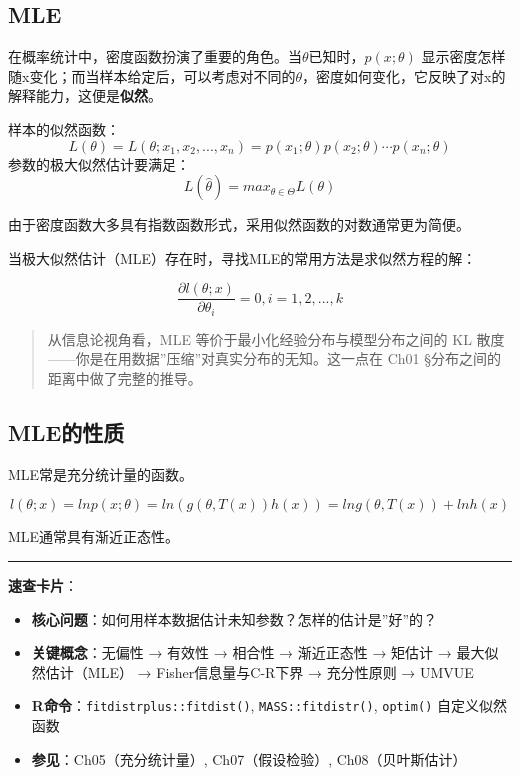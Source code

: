 \documentclass[
]{book}
\providecommand{\tightlist}{%
  \setlength{\itemsep}{0pt}\setlength{\parskip}{0pt}}
\begin{document}
\subsection{MLE}\label{mle}

在概率统计中，密度函数扮演了重要的角色。当\(\theta\)已知时，\(p(x;\theta)\) 显示密度怎样随x变化；而当样本给定后，可以考虑对不同的\(\theta\)，密度如何变化，它反映了对x的解释能力，这便是\textbf{似然}。

样本的似然函数：
\[
L(\theta)=L(\theta;x_1,x_2,...,x_n)=p(x_1;\theta)p(x_2;\theta)\cdots p(x_n;\theta)
\]
参数的极大似然估计要满足：
\[
L(\hat{\theta})=max_{\theta\in\Theta}L(\theta)
\]

由于密度函数大多具有指数函数形式，采用似然函数的对数通常更为简便。

当极大似然估计（MLE）存在时，寻找MLE的常用方法是求似然方程的解：

\[
\frac{\partial l(\theta;x)}{\partial \theta_i}=0,i=1,2,...,k
\]

\begin{quote}
从信息论视角看，MLE 等价于最小化经验分布与模型分布之间的 KL 散度------你是在用数据''压缩''对真实分布的无知。这一点在 Ch01 §分布之间的距离中做了完整的推导。
\end{quote}

\subsection{MLE的性质}\label{mleux7684ux6027ux8d28}

MLE常是充分统计量的函数。

\[
l(\theta;x)=lnp(x;\theta)=ln(g(\theta,T(x))h(x))=ln g(\theta,T(x))+ln h(x)
\]

MLE通常具有渐近正态性。

\begin{center}\rule{0.5\linewidth}{0.5pt}\end{center}

\textbf{速查卡片}：

\begin{itemize}
\tightlist
\item
  \textbf{核心问题}：如何用样本数据估计未知参数？怎样的估计是''好''的？
\item
  \textbf{关键概念}：无偏性 → 有效性 → 相合性 → 渐近正态性 → 矩估计 → 最大似然估计（MLE） → Fisher信息量与C-R下界 → 充分性原则 → UMVUE
\item
  \textbf{R命令}：\texttt{fitdistrplus::fitdist()}, \texttt{MASS::fitdistr()}, \texttt{optim()} 自定义似然函数
\item
  \textbf{参见}：Ch05（充分统计量）, Ch07（假设检验）, Ch08（贝叶斯估计）
\end{itemize}
\end{document}
